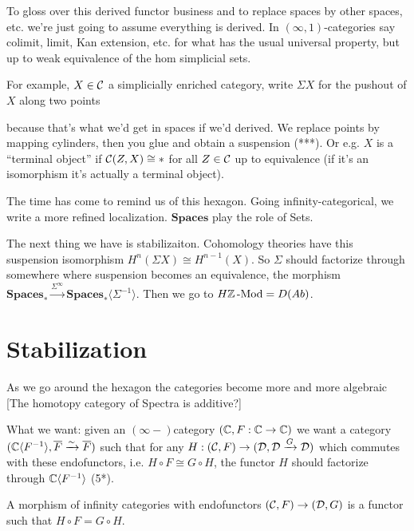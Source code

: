 \documentclass[class=report, crop=false,a4paper,twoside]{standalone}
\begin{document}
To gloss over this derived functor business and to replace spaces by other spaces, etc. we're just going to assume everything is derived. In $(\infty,1)$-categories say colimit, limit, Kan extension, etc. for what has the usual universal property, but up to weak equivalence of the hom simplicial sets.

For example, $X \in \mathcal{C}$ a simplicially enriched category, write $\Sigma X$ for the pushout of $X$ along two points
\begin{center}
\end{center}
because that's what we'd get in spaces if we'd derived. We replace points by mapping cylinders, then you glue and obtain a suspension (***). Or e.g. $X$ is a ``terminal object'' if $\mathcal{C}(Z,X) \cong *$ for all $Z \in \mathcal{C}$ up to equivalence (if it's an isomorphism it's actually a terminal object).

The time has come to remind us of this hexagon. Going infinity-categorical, we write a more refined localization. 
$\mathbf{Spaces}$ play the role of Sets. 

The next thing we have is stabilizaiton. Cohomology theories have this suspension isomorphism $H^n(\Sigma X) \cong H^{n-1}(X)$. So $\Sigma$ should factorize through somewhere where suspension becomes an equivalence, the morphism $\mathbf{Spaces}_* \xrightarrow{\Sigma^\infty} \mathbf{Spaces}_*\langle \Sigma^{-1} \rangle$. Then we go to $H\mathbb{Z}\operatorname{-Mod} = D(Ab)$. 

\section{Stabilization}
As we go around the hexagon the categories become more and more algebraic [The homotopy category of Spectra is additive?]

What we want: given an $(\infty-)$category $(\mathbb{C},F: \mathbb{C} \to \mathbb{C})$ we want a category $(\mathbb{C}\langle F^{-1} \rangle, \overline{F} \xrightarrow{\sim} \overline{F})$ such that for any $H: (\mathcal{C},F) \to (\mathcal{D},\mathcal{D} \xrightarrow{G} \mathcal{D})$ which commutes with these endofunctors, i.e. $H \circ F \cong G \circ H$, the functor $H$ should factorize through $\mathbb{C}\langle F^{-1} \rangle$ (5*). 

A morphism of infinity categories with endofunctors $(\mathcal{C},F) \to (\mathcal{D},G)$ is a functor such that $H \circ F = G \circ H$. 
\end{document}

